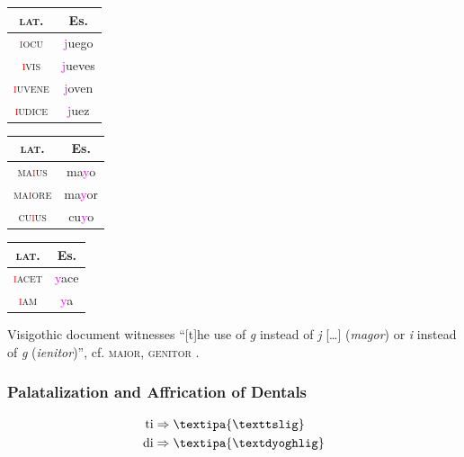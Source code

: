 \documentclass{report}[12pt]
\begin{document}
\begin{center}
  \begin{tabular}{c c}
    \textsc{lat.} & Es. \\
    \hline
    \textsc{\textcolor{red}{i}ocu} & \textcolor{magenta}{j}uego \quad [x] \\
    \textsc{\textcolor{red}{i}vis} & \textcolor{magenta}{j}ueves \quad [x] \\
    \textsc{\textcolor{red}{i}uvene} & \textcolor{magenta}{j}oven \quad [x] \\
    \textsc{\textcolor{red}{i}udice} & \textcolor{magenta}{j}uez \quad [x] \\
  \end{tabular}
\end{center}

\begin{center}
  \begin{tabular}{c c}
    \textsc{lat.} & Es. \\
    \hline
    \textsc{ma\textcolor{red}{i}us} & ma\textcolor{magenta}{y}o \\
    \textsc{ma\textcolor{red}{i}ore} & ma\textcolor{magenta}{y}or \\
    \textsc{cu\textcolor{red}{i}us} & cu\textcolor{magenta}{y}o \\
  \end{tabular}
\end{center}

\begin{center}
  \begin{tabular}{c c}
    \textsc{lat.} & Es. \\
    \hline
    \textsc{\textcolor{red}{i}acet} & \textcolor{magenta}{y}ace \\
    \textsc{\textcolor{red}{i}am} & \textcolor{magenta}{y}a \\
  \end{tabular}
\end{center}
Visigothic document witnesses ``[t]he use of \emph{g} instead of \emph{j} [\dots] (\emph{magor}) or \emph{i} instead of \emph{g} (\emph{ienitor})'', cf. \textsc{maior}, \textsc{genitor} \parencite[p.~159]{latin_palaeography}.

\subsubsection{Palatalization and Affrication of Dentals}\label{sec:dental_palatalization}

\begin{tcolorbox}
  \begin{align*}
    \text{ti} & \Rightarrow \text{\textipa{\texttslig}} \\
    \text{di} & \Rightarrow \text{\textipa{\textdyoghlig}} \\
  \end{align*}
\end{tcolorbox}
\end{document}
